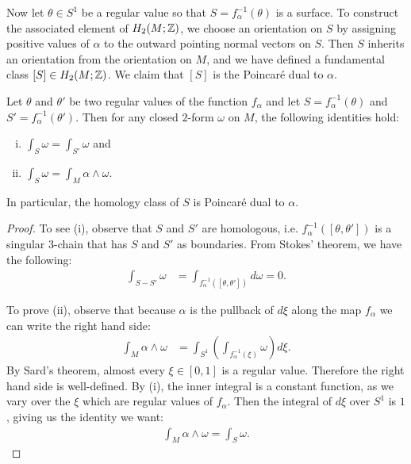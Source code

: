 Now let $\theta \in S^1$ be a regular value so that $S = f^{-1}_{\alpha}(\theta)$ is a surface.
To construct the associated element of $H_2(M;\mathbb{Z})$, we choose an orientation on $S$ by assigning positive values of $\alpha$ to the outward pointing normal vectors on $S$.
Then $S$ inherits an orientation from the orientation on $M$, and we have defined a
fundamental class $[S]\in H_2(M;\mathbb{Z})$.
We claim that $[S]$ is the Poincar\'e dual to $\alpha$.
\begin{lem}
  Let $\theta$ and $\theta'$ be two regular values of the function $f_{\alpha}$ and let $S=f_\alpha^{-1}(\theta)$ and $S'=f_\alpha^{-1}(\theta')$.
  Then for any closed $2$-form $\omega$ on $M$, the following identities hold:
  \begin{enumerate}[(i)]
  \item $\displaystyle
    \int_{S} \omega = \displaystyle\int_{S'} \omega$ and
 \item $\displaystyle
    \int_S \omega = \displaystyle\int_M \alpha \wedge \omega.$
  \end{enumerate}
  In particular, the homology class of $S$ is Poincar\'e dual to $\alpha$.
\end{lem}
\begin{proof}
  To see (i), observe that $S$ and $S'$ are homologous, i.e. $f^{-1}_{\alpha}([\theta, \theta'])$ is a singular $3$-chain that has $S$ and $S'$ as boundaries.
  From Stokes' theorem, we have the following:
  \begin{align*}
    \int_{S - S'} \omega &= \int_{f_{\alpha}^{-1}([\theta, \theta'])} d\omega
                         = 0.
  \end{align*}

  To prove (ii), observe that because $\alpha$ is the pullback of $d\xi$ along the map $f_{\alpha}$ we can write the right hand side:
  \begin{align*}
    \int_M \alpha \wedge \omega &= \int_{S^1} \left(   \int_{f_{\alpha}^{-1}(\xi)} \omega \right) d\xi.
  \end{align*}
  By Sard's theorem, almost every $\xi \in [0,1]$ is a regular value.  Therefore the right hand side is well-defined.
  By (i), the inner integral is a constant function, as we vary over the $\xi$ which are regular values of $f_{\alpha}$.
  Then the integral of $d\xi$ over $S^1$ is $1$, giving us the identity we want:
  \begin{align*}
    \int_M \alpha \wedge \omega = \int_S \omega.
  \end{align*}
\end{proof}
